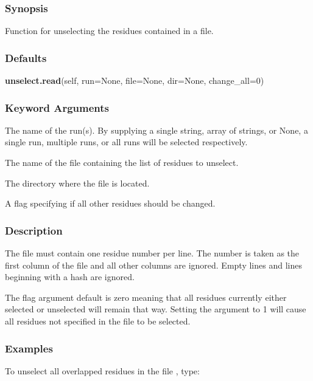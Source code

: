 \subsubsection{Synopsis}

Function for unselecting the residues contained in a file.

\subsubsection{Defaults}

\textsf{\textbf{unselect.read}(self, run=None, file=None, dir=None, change\_all=0)}


\subsubsection{Keyword Arguments}


  The name of the run(s).  By supplying a single string, array of strings, or None, a single run, multiple runs, or all runs will be selected respectively.

  The name of the file containing the list of residues to unselect.

  The directory where the file is located.

  A flag specifying if all other residues should be changed.

\subsubsection{Description}

The file must contain one residue number per line.  The number is taken as the first column
of the file and all other columns are ignored.  Empty lines and lines beginning with a hash
are ignored.

The 
 flag argument default is zero meaning that all residues currently either
selected or unselected will remain that way.  Setting the argument to 1 will cause all
residues not specified in the file to be selected.


\subsubsection{Examples}

To unselect all overlapped residues in the file 
, type:


